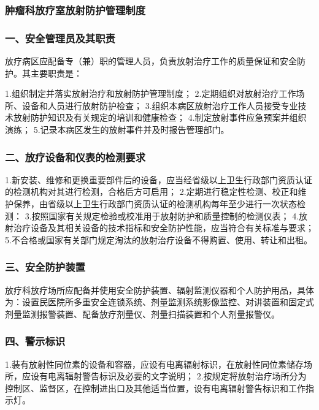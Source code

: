 \subsubsection{肿瘤科放疗室放射防护管理制度}

\subsubsection{一、安全管理员及其职责}

放疗病区应配备专（兼）职的管理人员，负责放射治疗工作的质量保证和安全防护。其主要职责是：

1.组织制定并落实放射治疗和放射防护管理制度；
2.定期组织对放射治疗工作场所、设备和人员进行放射防护检查；
3.组织本病区放射治疗工作人员接受专业技术放射防护知识及有关规定的培训和健康检查；
4.制定放射事件应急预案并组织演练；
5.记录本病区发生的放射事件并及时报告管理部门。

\subsubsection{二、放疗设备和仪表的检测要求}

1.新安装、维修和更换重要部件后的设备，应当经省级以上卫生行政部门资质认证的检测机构对其进行检测，合格后方可启用；
2.定期进行稳定性检测、校正和维护保养，由省级以上卫生行政部门资质认证的检测机构每年至少进行一次状态检测：
3.按照国家有关规定检验或校准用于放射防护和质量控制的检测仪表；
4.放射治疗设备及其相关设备的技术指标和安全防护性能，应当符合有关标准与要求；
5.不合格或国家有关部门规定淘汰的放射治疗设备不得购置、使用、转让和出租。

\subsubsection{三、安全防护装置}

放疗科放疗场所应配备并使用安全防护装置、辐射监测仪器和个人防护用品，具体为：设置民医院所多重安全连锁系统、剂量监测系统影像监控、对讲装置和固定式剂量监测报警装置、配备放疗剂量仪、剂量扫描装置和个人剂量报警仪。

\subsubsection{四、警示标识}

1.装有放射性同位素的设备和容器，应设有电离辐射标识，在放射性同位素储存场所，应设有电离辐射警告标识及必要的文字说明；
2.按规定将放射治疗场所分为控制区、监督区，在控制进出口及其他适当位置，设有电离辐射警告标识和工作指示灯。

